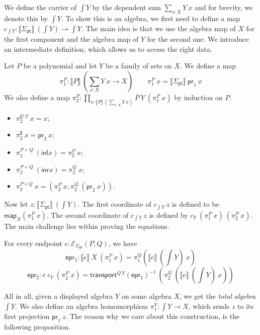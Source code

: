 \documentclass[9pt]{entcs}
\newcommand{\term}[1]{\mathsf{#1}}
\newcommand{\constructor}[1]{\mathbf{#1}}
\newcommand{\function}[1]{\mathsf{#1}}
\newcommand{\deprod}[3]{\prod_{#1 : #2} #3} %
\newcommand{\desum}[3]{\sum_{#1 : #2} #3} %
\newcommand{\0}{\textbf{0}} %
\newcommand{\1}{\textbf{1}} %
\newcommand{\inl}{\term{inl}} %
\newcommand{\inr}{\term{inr}} %
\newcommand{\prl}{\term{pr}_1} %
\newcommand{\prr}{\term{pr}_2} %
\newcommand{\transport}[2]{\function{transport}^{#1} #2} %
\newcommand{\invP}[1]{(#1)^{-1}} %
\newcommand{\C}{\constructor{C}} %
\newcommand{\I}{\constructor{I}} %
\newcommand{\sumP}[2]{#1 + #2} %
\newcommand{\prodP}[2]{#1 \times #2} %
\newcommand{\ep}[3]{\mathcal{E}_{#1}(#2,#3)} %
\newcommand{\pt}[0]{\textsf{pt}}
\newcommand{\pointc}[1]{#1_{\pt}} %
\newcommand{\semP}[1]{\llbracket #1 \rrbracket} %
\newcommand{\semE}[1]{\llbracket #1 \rrbracket} %
\newcommand{\constrA}[1]{\function{map}_{#1}} %
\newcommand{\polydact}[2]{\overline{#1} \> #2} %
\newcommand{\epdact}[2]{\overline{#1} \> #2} %
\newcommand{\total}[1]{\int #1} %
\newcommand{\proj}[1]{\pi_1^{#1}} %
\newcommand{\Ppl}[1]{\pi_1^{#1}} %
\newcommand{\Ppr}[1]{\pi_2^{#1}} %
\newcommand{\Epl}{\function{epr_1}} %
\newcommand{\Epr}{\function{epr_2}} %
\begin{document}
We define the carrier of $\total{Y}$ by the dependent sum $\desum{x}{X}{Y \> x}$ and for brevity, we denote this by $\total{Y}$.
To show this is an algebra, we first need to define a map $c_{\total{Y}} : \semP{\pointc{\Sigma}} \> (\total{Y}) \rightarrow \total{Y}$.
The main idea is that we use the algebra map of $X$ for the first component and the algebra map of $Y$ for the second one.
We introduce an intermediate definition, which allows us to access the right data.

\begin{definition}
Let $P$ be a polynomial and let $Y$ be a family of sets on $X$.
We define a map
\[
\Ppl{P} : \semP{P} \> (\desum{x}{X}{Y \> x} \rightarrow X)
\quad \quad
\Ppl{P} \> x = \semP{\pointc{\Sigma}} \> \prl \> x
\]
We also define a map $\Ppr{P} : \deprod{x}{\semP{P} \> (\desum{x}{X}{Y \> x})}{\polydact{P}{Y} \> (\Ppl{P} \> x)}$ by induction on $P$.
\begin{itemize}
	\item $\Ppr{\C \> T} \> x  = x$;
	\item $\Ppr{\I} \> x = \prr \> x$;
	\item $\Ppr{\sumP{P}{Q}} \> (\inl x) = \Ppr{P} \> x$;
	\item $\Ppr{\sumP{P}{Q}} \> (\inr x) = \Ppr{Q} \> x$;
	\item $\Ppr{\prodP{P}{Q}} \> x = (\Ppr{P} \> x , \Ppr{Q} \> (\prr \> x))$.
\end{itemize}
\end{definition}

Now let $z : \semP{\pointc{\Sigma}} \> (\total{Y})$.
The first coordinate of $c_{\total{Y}} \> z$ is defined to be $\constrA{X}(\Ppl{P} \> x)$.
The second coordinate of $c_{\total{Y}} \> z$ is defined by $c_Y \> (\Ppl{P} \> x) \> (\Ppr{P} \> x)$.
The main challenge lies within proving the equations.

\begin{lemma}
For every endpoint $e : \ep{\pointc{\Sigma}}{P}{Q}$, we have
\[
\Epl : \semE{e} \> X \> (\Ppl{P} \> x) = \Ppl{Q}(\semE{e} \> (\total{Y}) \> x) 
\]
\[
\Epr : \epdact{e}{c_Y} \> (\Ppr{P} \> x) = \transport{\polydact{Q}{Y}}{\invP{\Epl}} \> (\Ppr{Q} \> (\semE{e} \> (\total{Y}) \> x))
\]
\end{lemma}

All in all, given a displayed algebra $Y$ on some algebra $X$, we get the \emph{total algebra} $\total{Y}$.
We also define an algebra homomorphism $\proj{Y} : \total{Y} \rightarrow X$, which sends $z$ to its first projection $\prl \> z$.
The reason why we care about this construction, is the following proposition.
\end{document}

